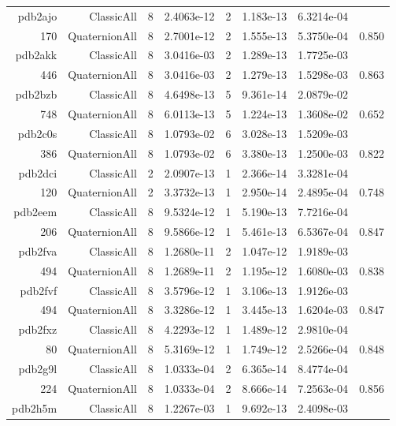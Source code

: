\begin{xltabular}{\textwidth}{r|rcS[table-format=1.4e+2]cS[table-format=1.3e+2]S[table-format=1.4e+2]S[table-format=-1.3]}
pdb2ajo & ClassicAll & 8 & 2.4063e-12 & 2 & 1.183e-13 & 6.3214e-04 & \\
170 & QuaternionAll & 8 & 2.7001e-12 & 2 & 1.555e-13 & 5.3750e-04 & 0.850\\  \addlinespace
pdb2akk & ClassicAll & 8 & 3.0416e-03 & 2 & 1.289e-13 & 1.7725e-03 & \\
446 & QuaternionAll & 8 & 3.0416e-03 & 2 & 1.279e-13 & 1.5298e-03 & 0.863\\  \addlinespace
pdb2bzb & ClassicAll & 8 & 4.6498e-13 & 5 & 9.361e-14 & 2.0879e-02 & \\
748 & QuaternionAll & 8 & 6.0113e-13 & 5 & 1.224e-13 & 1.3608e-02 & 0.652\\  \addlinespace
pdb2c0s & ClassicAll & 8 & 1.0793e-02 & 6 & 3.028e-13 & 1.5209e-03 & \\
386 & QuaternionAll & 8 & 1.0793e-02 & 6 & 3.380e-13 & 1.2500e-03 & 0.822\\  \addlinespace
pdb2dci & ClassicAll & 2 & 2.0907e-13 & 1 & 2.366e-14 & 3.3281e-04 & \\
120 & QuaternionAll & 2 & 3.3732e-13 & 1 & 2.950e-14 & 2.4895e-04 & 0.748\\  \addlinespace
pdb2eem & ClassicAll & 8 & 9.5324e-12 & 1 & 5.190e-13 & 7.7216e-04 & \\
206 & QuaternionAll & 8 & 9.5866e-12 & 1 & 5.461e-13 & 6.5367e-04 & 0.847\\  \addlinespace
pdb2fva & ClassicAll & 8 & 1.2680e-11 & 2 & 1.047e-12 & 1.9189e-03 & \\
494 & QuaternionAll & 8 & 1.2689e-11 & 2 & 1.195e-12 & 1.6080e-03 & 0.838\\  \addlinespace
pdb2fvf & ClassicAll & 8 & 3.5796e-12 & 1 & 3.106e-13 & 1.9126e-03 & \\
494 & QuaternionAll & 8 & 3.3286e-12 & 1 & 3.445e-13 & 1.6204e-03 & 0.847\\  \addlinespace
pdb2fxz & ClassicAll & 8 & 4.2293e-12 & 1 & 1.489e-12 & 2.9810e-04 & \\
80 & QuaternionAll & 8 & 5.3169e-12 & 1 & 1.749e-12 & 2.5266e-04 & 0.848\\  \addlinespace
pdb2g9l & ClassicAll & 8 & 1.0333e-04 & 2 & 6.365e-14 & 8.4774e-04 & \\
224 & QuaternionAll & 8 & 1.0333e-04 & 2 & 8.666e-14 & 7.2563e-04 & 0.856\\  \addlinespace
pdb2h5m & ClassicAll & 8 & 1.2267e-03 & 1 & 9.692e-13 & 2.4098e-03 & \\

\end{xltabular}
